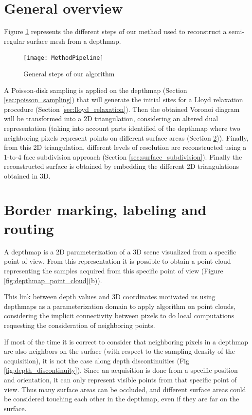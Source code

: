 \documentclass[11pt,fleqn]{book} %
\begin{document}
\section{General overview}
\label{sec:general_overview}

Figure \ref{fig:general_steps} represents the different steps of our method used to reconstruct a semi-regular surface mesh from a depthmap.

\begin{figure}[ht]
\centering\texttt{[image: MethodPipeline]}
\caption{General steps of our algorithm}
\label{fig:general_steps}
\end{figure}

A Poisson-disk sampling is applied on the depthmap (Section \ref{sec:poisson_sampling}) that will generate the initial sites for a Lloyd relaxation procedure (Section \ref{sec:lloyd_relaxation}). 
Then the obtained Voronoi diagram will be transformed into a 2D triangulation, considering an altered dual representation (taking into account parts identified of the depthmap where two neighboring pixels represent points on different surface areas (Section \ref{sec:border_marking})). 
Finally, from this 2D triangulation, different levels of resolution are reconstructed using a 1-to-4 face subdivision approach (Section \ref{sec:surface_subdivision}).
Finally the reconstructed surface is obtained by embedding the different 2D triangulations obtained in 3D.

\section{Border marking, labeling and routing}
\label{sec:border_marking}

A depthmap is a 2D parameterization of a 3D scene visualized from a specific point of view. From this representation it is possible to obtain a point cloud representing the samples acquired from this specific point of view (Figure \ref{fig:depthmap_point_cloud}(b)).

This link between depth values and 3D coordinates motivated us using depthmaps as a parameterization domain to apply algorithm on point clouds, considering the implicit connectivity between pixels to do local computations requesting the consideration of neighboring points.

If most of the time it is correct to consider that neighboring pixels in a depthmap are also neighbors on the surface (with respect to the sampling density of the acquisition), it is not the case along depth discontinuities (Fig \ref{fig:depth_discontinuity}).
Since an acquisition is done from a specific position and orientation, it can only represent visible points from that specific point of view. 
Thus many surface areas can be occluded, and different surface areas could be considered touching each other in the depthmap, even if they are far on the surface.
\end{document}

